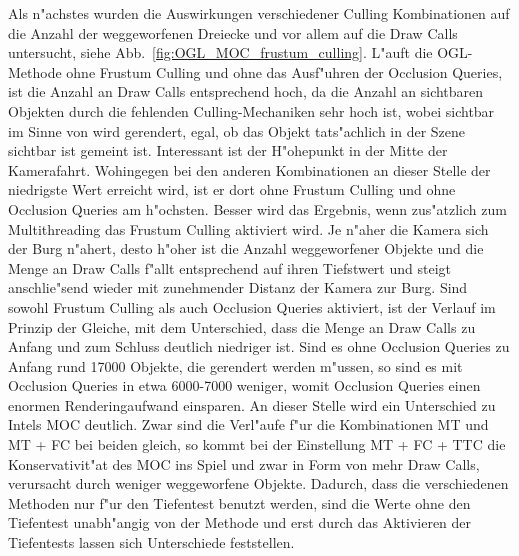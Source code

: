 \documentclass[journal]{vgtc}
\begin{document}
Als n"achstes wurden die Auswirkungen verschiedener Culling Kombinationen auf die Anzahl der weggeworfenen Dreiecke und vor allem auf die Draw Calls untersucht, siehe Abb.\ \ref{fig:OGL_MOC_frustum_culling}.
L"auft die OGL-Methode ohne Frustum Culling und ohne das Ausf"uhren der Occlusion Queries, ist die Anzahl an Draw Calls entsprechend hoch, da die Anzahl an sichtbaren Objekten durch die fehlenden Culling-Mechaniken sehr hoch ist, wobei sichtbar im Sinne von \glqq wird gerendert, egal, ob das Objekt tats"achlich in der Szene sichtbar ist\grqq{} gemeint ist.
Interessant ist der H"ohepunkt in der Mitte der Kamerafahrt.
Wohingegen bei den anderen Kombinationen an dieser Stelle der niedrigste Wert erreicht wird, ist er dort ohne Frustum Culling und ohne Occlusion Queries am h"ochsten.
Besser wird das Ergebnis, wenn zus"atzlich zum Multithreading das Frustum Culling aktiviert wird.
Je n"aher die Kamera sich der Burg n"ahert, desto h"oher ist die Anzahl weggeworfener Objekte und die Menge an Draw Calls f"allt entsprechend auf ihren Tiefstwert und steigt anschlie"send wieder mit zunehmender Distanz der Kamera zur Burg.
Sind sowohl Frustum Culling als auch Occlusion Queries aktiviert, ist der Verlauf im Prinzip der Gleiche, mit dem Unterschied, dass die Menge an Draw Calls zu Anfang und zum Schluss deutlich niedriger ist.
Sind es ohne Occlusion Queries zu Anfang rund 17000 Objekte, die gerendert werden m"ussen, so sind es mit Occlusion Queries in etwa 6000-7000 weniger, womit Occlusion Queries einen enormen Renderingaufwand einsparen.
An dieser Stelle wird ein Unterschied zu Intels MOC deutlich. Zwar sind die Verl"aufe f"ur die Kombinationen \glqq MT\grqq{} und \glqq MT + FC\grqq{} bei beiden gleich, so kommt bei der Einstellung \glqq MT + FC + TTC\grqq{} die Konservativit"at des MOC ins Spiel und zwar in Form von mehr Draw Calls, verursacht durch weniger weggeworfene Objekte.
Dadurch, dass die verschiedenen Methoden nur f"ur den Tiefentest benutzt werden, sind die Werte ohne den Tiefentest unabh"angig von der Methode und erst durch das Aktivieren der Tiefentests lassen sich Unterschiede feststellen.
		
\end{document}
